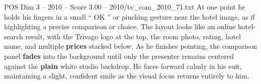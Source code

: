 \begin{textsample}{POS Dim 3 – 2010 – Score 3.00 – 2010/tv\_com\_2010\_71.txt}
At one point he holds his fingers in a small “ OK ” or pinching gesture near the hotel image, as if highlighting a precise comparison or choice.
The layout looks like an online hotel-search result, with the Trivago logo at the top, the room photo, rating, hotel name, and multiple \textbf{prices} stacked below.
As he finishes pointing, the comparison panel \textbf{fades} into the background until only the presenter remains centered against the \textbf{plain} white studio backdrop.
He faces forward calmly in his suit, maintaining a slight, confident smile as the visual focus returns entirely to him.

\end{textsample}
